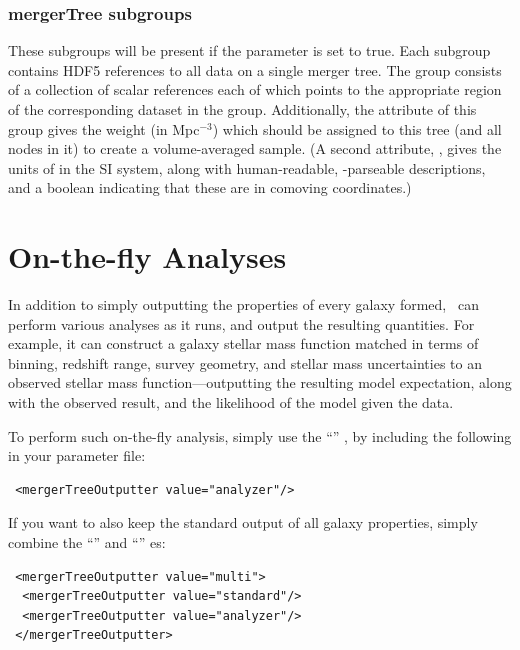\subsubsection{mergerTree subgroups}\label{sec:mergerTreeSubgroups}

These subgroups will be present if the \mono{[mergerTreeOutputReferences]} parameter is set to true. Each  subgroup contains HDF5 references to all data on a single merger tree. The group consists of a collection of scalar references each of which points to the appropriate region of the corresponding dataset in the  group. Additionally, the  attribute of this group gives the weight (in Mpc$^{-3}$) which should be assigned to this tree (and all nodes in it) to create a volume-averaged sample. (A second attribute, , gives the units of  in the SI system, along with human-readable, -parseable descriptions, and a boolean indicating that these are in comoving coordinates.)

\section{On-the-fly Analyses}\label{sec:onTheFlyAnalyses}

In addition to simply outputting the properties of every galaxy formed, \glc\ can perform various analyses as it runs, and output the resulting quantities. For example, it can construct a galaxy stellar mass function matched in terms of binning, redshift range, survey geometry, and stellar mass uncertainties to an observed stellar mass function---outputting the resulting model expectation, along with the observed result, and the likelihood of the model given the data. 

To perform such on-the-fly analysis, simply use the ``'' , by including the following in your parameter file:
\begin{verbatim}
 <mergerTreeOutputter value="analyzer"/>
\end{verbatim}
If you want to also keep the standard output of all galaxy properties, simply combine the ``'' and ``'' es:
\begin{verbatim}
 <mergerTreeOutputter value="multi">
  <mergerTreeOutputter value="standard"/>
  <mergerTreeOutputter value="analyzer"/>
 </mergerTreeOutputter>
\end{verbatim}

